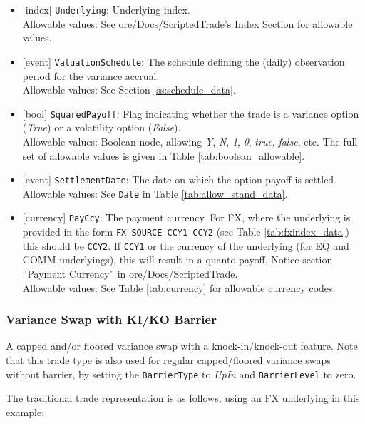 \begin{itemize}
  \item{}[index] \lstinline!Underlying!: Underlying index. \\
  Allowable values: See ore/Docs/ScriptedTrade's Index Section for allowable values.
  \item{}[event] \lstinline!ValuationSchedule!: The schedule defining the (daily) observation period for the variance accrual. \\
  Allowable values: See Section \ref{ss:schedule_data}.
  \item{}[bool] \lstinline!SquaredPayoff!: Flag indicating whether the trade is a variance option (\emph{True}) or a volatility
  option (\emph{False}). \\
  Allowable values: Boolean node, allowing \emph{Y}, \emph{N}, \emph{1}, \emph{0}, \emph{true}, \emph{false}, etc.
  The full set of allowable values is given in Table \ref{tab:boolean_allowable}.
  \item{}[event] \lstinline!SettlementDate!: The date on which the option payoff is settled. \\
  Allowable values: See \lstinline!Date! in Table \ref{tab:allow_stand_data}.
  \item{}[currency] \lstinline!PayCcy!: The payment currency. For FX, where the underlying is provided
      in the form \lstinline!FX-SOURCE-CCY1-CCY2! (see Table \ref{tab:fxindex_data}) this should
      be \lstinline!CCY2!. If \lstinline!CCY1! or the currency of the underlying (for EQ and
      COMM underlyings), this will result in a quanto payoff. Notice section ``Payment Currency'' in ore/Docs/ScriptedTrade. \\
        Allowable values: See Table \ref{tab:currency}  for allowable currency codes.
\end{itemize}

\subsubsection{Variance Swap with KI/KO Barrier}

A capped and/or floored variance swap with a knock-in/knock-out feature. Note that this trade type is also used for regular capped/floored
variance swaps without barrier, by setting the \lstinline!BarrierType! to \emph{UpIn} and \lstinline!BarrierLevel! to zero.

The traditional trade representation is as follows, using an FX underlying in this example:

